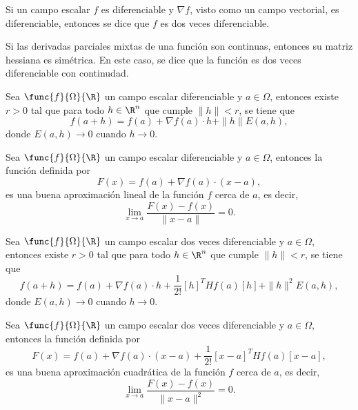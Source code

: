 \documentclass[a4,11pt]{aleph-notas}
\begin{document}
\begin{advertencia}
    Si un campo escalar $f$ es diferenciable y $\nabla f$, visto como un campo vectorial, es diferenciable, entonces se dice que $f$ es dos veces diferenciable.
\end{advertencia}

\begin{advertencia}
    Si las derivadas parciales mixtas de una función son continuas, entonces su matriz hessiana es simétrica. En este caso, se dice que la función es dos veces diferenciable con continudad.
\end{advertencia}
 

\begin{teo}
    Sea $\func{f}{\Omega}{\R}$ un campo escalar diferenciable y $a\in \Omega$, entonces existe $r>0$ tal que para todo $h\in\R^n$ que cumple $\|h\|<r$, se tiene que
    \[
        f(a+h) = f(a) + \nabla f(a) \cdot h + \|h\| E(a,h),
    \]
    donde $E(a,h)\to 0$ cuando $h\to 0$.
\end{teo}
 

\begin{prop}
    Sea $\func{f}{\Omega}{\R}$ un campo escalar diferenciable y $a\in \Omega$, entonces la función definida por
    \[
        F(x) = f(a) + \nabla f(a) \cdot (x-a),
    \]
    es una buena aproximación lineal de la función $f$ cerca de $a$, es decir,
    \[
        \lim_{x\to a} \frac{F(x)-f(x)}{\|x-a\|} = 0.
    \]
\end{prop}
 

\begin{teo}
    Sea $\func{f}{\Omega}{\R}$ un campo escalar dos veces diferenciable y $a\in \Omega$, entonces existe $r>0$ tal que para todo $h\in\R^n$ que cumple $\|h\|<r$, se tiene que
    \[
        f(a+h) = f(a) + \nabla f(a) \cdot h +  \frac{1}{2!}[h]^T Hf(a) [h] +\|h\|^2 E(a,h),
    \]
    donde $E(a,h)\to 0$ cuando $h\to 0$.
\end{teo}
 

\begin{prop}
    Sea $\func{f}{\Omega}{\R}$ un campo escalar dos veces diferenciable y $a\in \Omega$, entonces la función definida por
    \[
        F(x) = f(a) + \nabla f(a) \cdot (x-a) + \frac{1}{2!}[x-a]^T Hf(a) [x-a],
    \]
    es una buena aproximación cuadrática de la función $f$ cerca de $a$, es decir,
    \[
        \lim_{x\to a} \frac{F(x)-f(x)}{\|x-a\|^2} = 0.
    \]
\end{prop}
\end{document}
